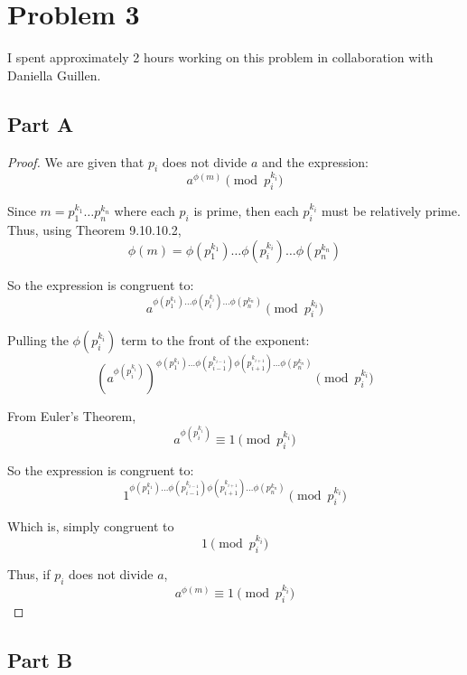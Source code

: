 \documentclass{article}
\begin{document}
\break

\section*{Problem 3}

I spent approximately 2 hours working on this problem in collaboration with
Daniella Guillen.

\subsection*{Part A}

\begin{proof}
  We are given that $p_i$ does not divide $a$ and the expression: 
  $$ a^{\phi(m)} \pmod{p_i^{k_i}} $$

  Since $m = p_1^{k_1} \ldots p_n^{k_n}$ where each $p_i$ is prime, then each
  $p_i^{k_i}$ must be relatively prime. Thus, using Theorem 9.10.10.2, 
  $$ \phi(m) = \phi\left(p_1^{k_1}\right) \ldots \phi\left(p_i^{k_i}\right)
  \ldots \phi\left(p_n^{k_n}\right) $$

  So the expression is congruent to: 
  $$ a^{\phi\left(p_1^{k_1}\right) \ldots \phi\left(p_i^{k_i}\right) \ldots
  \phi\left(p_n^{k_n}\right)} \pmod{p_i^{k_i}} $$

  Pulling the $\phi\left(p_i^{k_i}\right)$ term to the front of the exponent: 
  $$ \left(a^{\phi\left(p_i^{k_i}\right)} \right)^{\phi\left(p_1^{k_1}\right)
  \ldots \phi\left(p_{i-1}^{k_{i-1}}\right)
  \phi\left(p_{i+1}^{k_{i+1}}\right)\ldots \phi\left(p_n^{k_n}\right)}
  \pmod{p_i^{k_i}} $$

  From Euler's Theorem, 
  $$ a^{\phi\left(p_i^{k_i}\right)} \equiv 1 \pmod{p_i^{k_i}} $$

  So the expression is congruent to: 
  $$ 1^{\phi\left(p_1^{k_1}\right) \ldots \phi\left(p_{i-1}^{k_{i-1}}\right)
  \phi\left(p_{i+1}^{k_{i+1}}\right)\ldots \phi\left(p_n^{k_n}\right)}
  \pmod{p_i^{k_i}}$$
    
  Which is, simply congruent to 
  $$1 \pmod{p_i^{k_i}} $$

  Thus, if $p_i$ does not divide $a$, 
  $$ a^{\phi(m)} \equiv 1 \pmod{p_i^{k_i}} $$

\end{proof}

\break

\subsection*{Part B}
\end{document}
